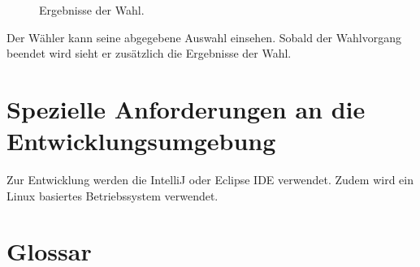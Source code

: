 \documentclass[parskip=full,11pt,twoside]{scrartcl}
\begin{document}
\begin{figure}[H]
	\caption{\label{fig:whlr-result}
		Ergebnisse der Wahl.
	}
\end{figure}
Der Wähler kann seine abgegebene Auswahl einsehen.
Sobald der Wahlvorgang beendet wird sieht er zusätzlich die Ergebnisse der Wahl.

\section{Spezielle Anforderungen an die Entwicklungsumgebung}
Zur Entwicklung werden die IntelliJ oder Eclipse IDE verwendet.
Zudem wird ein \gls{Linux} basiertes Betriebssystem verwendet.

\section{Glossar}
\printglossaries
\end{document}
